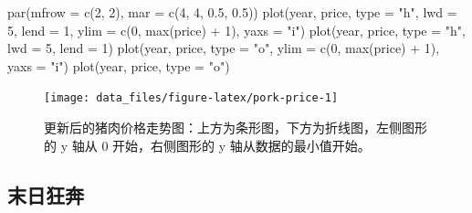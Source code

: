 \documentclass[
  b5paper,
  UTF8,twoside]{book}
\newenvironment{Shaded}{\begin{snugshade}}{\end{snugshade}}
\newcommand{\AttributeTok}[1]{\textcolor[rgb]{0.77,0.63,0.00}{#1}}
\newcommand{\DecValTok}[1]{\textcolor[rgb]{0.00,0.00,0.81}{#1}}
\newcommand{\FloatTok}[1]{\textcolor[rgb]{0.00,0.00,0.81}{#1}}
\newcommand{\FunctionTok}[1]{\textcolor[rgb]{0.00,0.00,0.00}{#1}}
\newcommand{\NormalTok}[1]{#1}
\newcommand{\SpecialCharTok}[1]{\textcolor[rgb]{0.00,0.00,0.00}{#1}}
\newcommand{\StringTok}[1]{\textcolor[rgb]{0.31,0.60,0.02}{#1}}
\begin{document}
\begin{Shaded}
\begin{Highlighting}[]
\FunctionTok{par}\NormalTok{(}\AttributeTok{mfrow =} \FunctionTok{c}\NormalTok{(}\DecValTok{2}\NormalTok{, }\DecValTok{2}\NormalTok{), }\AttributeTok{mar =} \FunctionTok{c}\NormalTok{(}\DecValTok{4}\NormalTok{, }\DecValTok{4}\NormalTok{, }\FloatTok{0.5}\NormalTok{, }\FloatTok{0.5}\NormalTok{))}
\FunctionTok{plot}\NormalTok{(year, price, }\AttributeTok{type =} \StringTok{"h"}\NormalTok{, }\AttributeTok{lwd =} \DecValTok{5}\NormalTok{, }\AttributeTok{lend =} \DecValTok{1}\NormalTok{, }\AttributeTok{ylim =} \FunctionTok{c}\NormalTok{(}\DecValTok{0}\NormalTok{, }\FunctionTok{max}\NormalTok{(price) }\SpecialCharTok{+} \DecValTok{1}\NormalTok{), }\AttributeTok{yaxs =} \StringTok{"i"}\NormalTok{)}
\FunctionTok{plot}\NormalTok{(year, price, }\AttributeTok{type =} \StringTok{"h"}\NormalTok{, }\AttributeTok{lwd =} \DecValTok{5}\NormalTok{, }\AttributeTok{lend =} \DecValTok{1}\NormalTok{)}
\FunctionTok{plot}\NormalTok{(year, price, }\AttributeTok{type =} \StringTok{"o"}\NormalTok{, }\AttributeTok{ylim =} \FunctionTok{c}\NormalTok{(}\DecValTok{0}\NormalTok{, }\FunctionTok{max}\NormalTok{(price) }\SpecialCharTok{+} \DecValTok{1}\NormalTok{), }\AttributeTok{yaxs =} \StringTok{"i"}\NormalTok{)}
\FunctionTok{plot}\NormalTok{(year, price, }\AttributeTok{type =} \StringTok{"o"}\NormalTok{)}
\end{Highlighting}
\end{Shaded}

\begin{figure}

{\centering \texttt{[image: data\_files/figure-latex/pork-price-1]} 

}

\caption[ 更新后的猪肉价格走势图 ]{更新后的猪肉价格走势图：上方为条形图，下方为折线图，左侧图形的 y 轴从 0 开始，右侧图形的 y 轴从数据的最小值开始。}\label{fig:pork-price}
\end{figure}



\hypertarget{subsec:canabalt}{%
\subsection{末日狂奔}\label{subsec:canabalt}}
\end{document}
